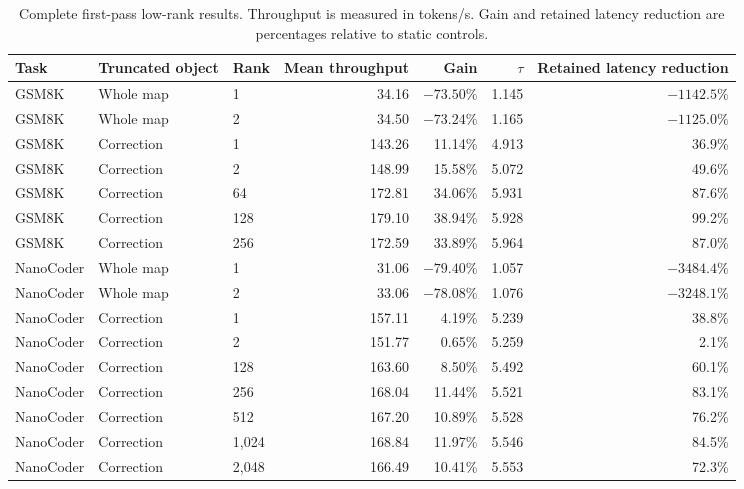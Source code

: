 \begin{table}[htbp]
\centering
\caption{Complete first-pass low-rank results. Throughput is measured in tokens/s. Gain and retained latency reduction are percentages relative to static controls.}
\label{tab:app-rank-first}
\scriptsize
\begin{tabular}{lllrrrr}
\toprule
Task & Truncated object & Rank & Mean throughput & Gain & $\tau$ & Retained latency reduction \\
\midrule
GSM8K & Whole map & 1 & 34.16 & $-73.50\%$ & 1.145 & $-1142.5\%$ \\
GSM8K & Whole map & 2 & 34.50 & $-73.24\%$ & 1.165 & $-1125.0\%$ \\
GSM8K & Correction & 1 & 143.26 & 11.14\% & 4.913 & 36.9\% \\
GSM8K & Correction & 2 & 148.99 & 15.58\% & 5.072 & 49.6\% \\
GSM8K & Correction & 64 & 172.81 & 34.06\% & 5.931 & 87.6\% \\
GSM8K & Correction & 128 & 179.10 & 38.94\% & 5.928 & 99.2\% \\
GSM8K & Correction & 256 & 172.59 & 33.89\% & 5.964 & 87.0\% \\
NanoCoder & Whole map & 1 & 31.06 & $-79.40\%$ & 1.057 & $-3484.4\%$ \\
NanoCoder & Whole map & 2 & 33.06 & $-78.08\%$ & 1.076 & $-3248.1\%$ \\
NanoCoder & Correction & 1 & 157.11 & 4.19\% & 5.239 & 38.8\% \\
NanoCoder & Correction & 2 & 151.77 & 0.65\% & 5.259 & 2.1\% \\
NanoCoder & Correction & 128 & 163.60 & 8.50\% & 5.492 & 60.1\% \\
NanoCoder & Correction & 256 & 168.04 & 11.44\% & 5.521 & 83.1\% \\
NanoCoder & Correction & 512 & 167.20 & 10.89\% & 5.528 & 76.2\% \\
NanoCoder & Correction & 1,024 & 168.84 & 11.97\% & 5.546 & 84.5\% \\
NanoCoder & Correction & 2,048 & 166.49 & 10.41\% & 5.553 & 72.3\% \\
\bottomrule
\end{tabular}
\end{table}

